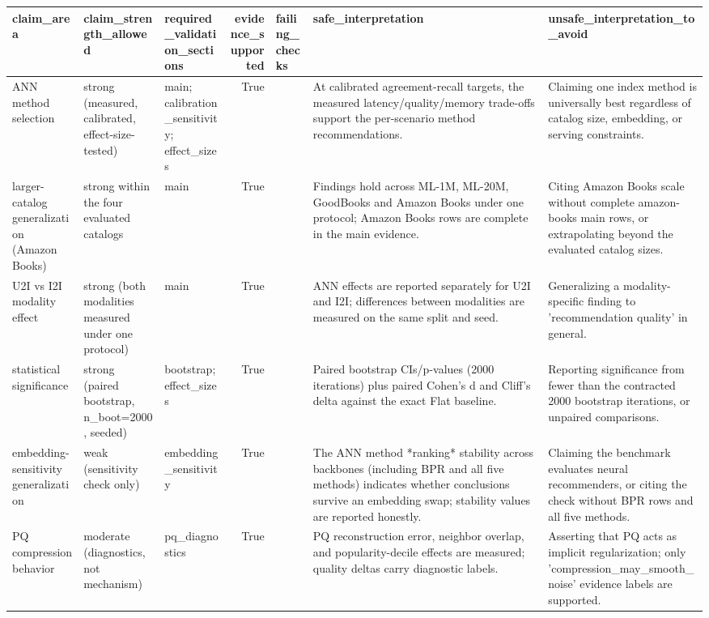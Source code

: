 \begin{tabular}{lllrlll}
\toprule
claim_area & claim_strength_allowed & required_validation_sections & evidence_supported & failing_checks & safe_interpretation & unsafe_interpretation_to_avoid \\
\midrule
ANN method selection & strong (measured, calibrated, effect-size-tested) & main; calibration_sensitivity; effect_sizes & True &  & At calibrated agreement-recall targets, the measured latency/quality/memory trade-offs support the per-scenario method recommendations. & Claiming one index method is universally best regardless of catalog size, embedding, or serving constraints. \\
larger-catalog generalization (Amazon Books) & strong within the four evaluated catalogs & main & True &  & Findings hold across ML-1M, ML-20M, GoodBooks and Amazon Books under one protocol; Amazon Books rows are complete in the main evidence. & Citing Amazon Books scale without complete amazon-books main rows, or extrapolating beyond the evaluated catalog sizes. \\
U2I vs I2I modality effect & strong (both modalities measured under one protocol) & main & True &  & ANN effects are reported separately for U2I and I2I; differences between modalities are measured on the same split and seed. & Generalizing a modality-specific finding to 'recommendation quality' in general. \\
statistical significance & strong (paired bootstrap, n_boot=2000, seeded) & bootstrap; effect_sizes & True &  & Paired bootstrap CIs/p-values (2000 iterations) plus paired Cohen's d and Cliff's delta against the exact Flat baseline. & Reporting significance from fewer than the contracted 2000 bootstrap iterations, or unpaired comparisons. \\
embedding-sensitivity generalization & weak (sensitivity check only) & embedding_sensitivity & True &  & The ANN method *ranking* stability across backbones (including BPR and all five methods) indicates whether conclusions survive an embedding swap; stability values are reported honestly. & Claiming the benchmark evaluates neural recommenders, or citing the check without BPR rows and all five methods. \\
PQ compression behavior & moderate (diagnostics, not mechanism) & pq_diagnostics & True &  & PQ reconstruction error, neighbor overlap, and popularity-decile effects are measured; quality deltas carry diagnostic labels. & Asserting that PQ acts as implicit regularization; only 'compression_may_smooth_noise' evidence labels are supported. \\

\end{tabular}
